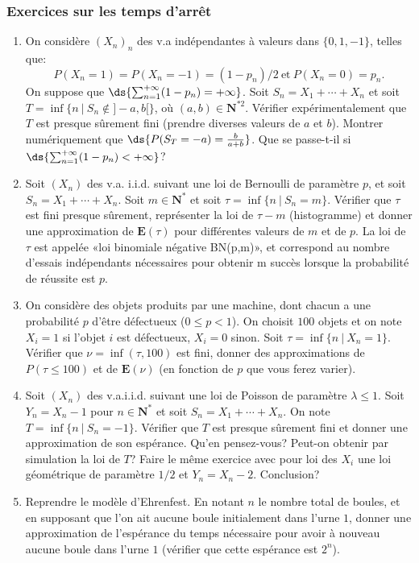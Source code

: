 %
\subsubsection{Exercices sur les temps d'arrêt}
%

\begin{enumerate}
\item On considère $(X_n)_n$ des v.a indépendantes à valeurs dans
  $\{0,1,-1\}$, telles que:
  $$
  P(X_n=1)=P(X_n=-1)=(1-p_n)/2~\mbox{et}~ P(X_n=0)=p_n.$$
  On suppose que
  $\ds{\sum _{n=1} ^{+\infty}(1-p_n)=+\infty}$. Soit
  $S_n=X_1+\cdots+X_n$ et soit $T=\inf \{n~|~S_n \notin ]-a,b[\}$, où
  $(a,b)\in \mathbf{N}^{*2}$. Vérifier expérimentalement que $T$ est presque
  sûrement fini (prendre diverses valeurs de $a$ et $b$). Montrer
  numériquement que $\ds{P(S_T=-a)=\frac b {a+b}}$. Que se
  passe-t-il si $\ds{\sum _{n=1} ^{+\infty}(1-p_n)<+\infty}$?
\item Soit $(X_n)$ des v.a. i.i.d. suivant une loi de Bernoulli de paramètre
  $p$, et soit $S_n=X_1+\cdots+X_n$. Soit $m \in \mathbf{N}^*$ et soit
  $\tau=\inf \{n~|~S_n=m\}$. Vérifier que $\tau$ est fini presque sûrement,
  représenter la loi de $\tau-m$ (histogramme) et donner une approximation de
  $\mathbf{E}(\tau)$ pour différentes valeurs de $m$ et de $p$. La loi de
  $\tau$ est appelée «loi binomiale négative BN(p,m)», et correspond au nombre
  d'essais indépendants nécessaires pour obtenir m succès lorsque la
  probabilité de réussite est $p$.
\item On considère des objets produits par une machine, dont chacun a une
  probabilité $p$ d'être défectueux ($0 \leq p <1$). On choisit $100$ objets
  et on note $X_i=1$ si l'objet $i$ est défectueux, $X_i=0$ sinon. Soit
  $\tau=\inf \{n~|~X_n=1\}$. Vérifier que $\nu=\inf(\tau,100)$ est fini,
  donner des approximations de $P(\tau \leq 100)$ et de $\mathbf{E}(\nu)$ (en
  fonction de $p$ que vous ferez varier). 
\item Soit $(X_n)$ des v.a.i.i.d. suivant une loi de Poisson de paramètre
  $\lambda \leq 1$. Soit $Y_n=X_n-1$ pour $n \in \mathbf{N}^*$ et soit
  $S_n=X_1+\cdots+X_n$. On note $T=\inf \{n~|~S_n =-1\}$. Vérifier que $T$ est
  presque sûrement fini et donner une approximation de son espérance. Qu'en
  pensez-vous? Peut-on obtenir par simulation la loi de $T$? Faire le même
  exercice avec pour loi des $X_i$ une loi géométrique de paramètre $1/2$ et
  $Y_n=X_n-2$. Conclusion?
\item Reprendre le modèle d'Ehrenfest. En notant $n$ le nombre total de
  boules, et en supposant que l'on ait aucune boule initialement dans l'urne
  $1$, donner une approximation de l'espérance du temps nécessaire pour avoir
  à nouveau aucune boule dans l'urne $1$ (vérifier que cette espérance est
  $2^n$).
\end{enumerate}    

